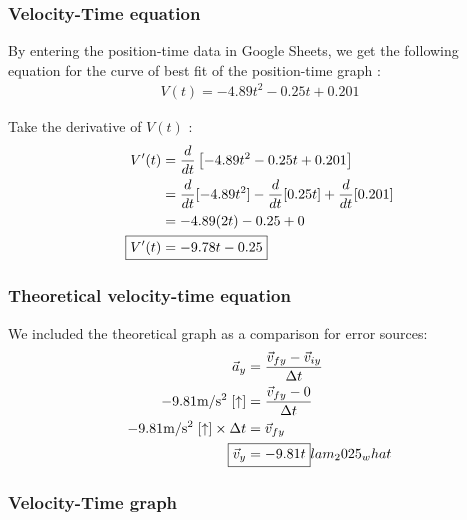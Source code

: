 \documentclass[a4paper,12pt]{article}
\begin{document}
	\subsubsection{Velocity-Time equation}
	By entering the position-time data in Google Sheets, we get the following equation for the curve of best fit of the position-time graph \cite{cite2}:
	\begin{align*}
	V(t)=-4.89t^2-0.25t+0.201 
	\end{align*}
	
	Take the derivative of $V(t)$ \cite{cite1}:
	\begin{align*}
		V'(t)&=\frac{d}{dt}\left[-4.89t^2-0.25t+0.201\right]\\
		&=\frac{d}{dt}[-4.89t^2]-\frac{d}{dt}[0.25t]+\frac{d}{dt}[0.201]\\
		&=-4.89(2t)-0.25+0\\
		\Aboxed{V'(t)&=-9.78t-0.25}
	\end{align*}
	\subsubsection{Theoretical velocity-time equation}
	We included the theoretical graph as a comparison for error sources:
	\begin{align*}
		\vec{a}_y&=\frac{\vec{v}_{fy}-\vec{v}_{iy}}{\Delta t}\\
		-9.81\text{m}/\text{s}^2\;[\uparrow]&=\frac{\vec{v}_{fy}-0}{\Delta t}\\
		-9.81\text{m}/\text{s}^2\;[\uparrow]\times\Delta t&=\vec{v}_{fy}\\
		\Aboxed{\vec{v}_y&=-9.81t}lam_2025_what
	\end{align*}
	
	\subsubsection{Velocity-Time graph}
	\begin{center}
	\end{center}
	
\end{document}
